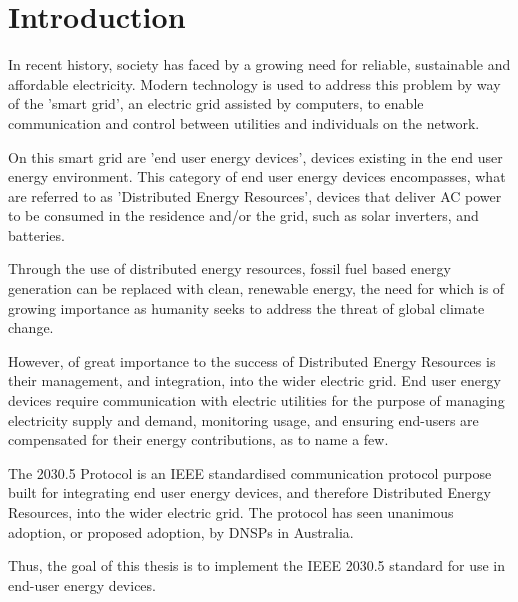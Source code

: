 \chapter{Introduction}\label{ch:intro}
In recent history, society has faced by a growing need for reliable, sustainable and affordable electricity.
Modern technology is used to address this problem by way of the 'smart grid', an electric grid assisted by computers, to enable communication and control between utilities and individuals on the network.

On this smart grid are 'end user energy devices', devices existing in the end user energy environment.
This category of end user energy devices encompasses, what are referred to as 'Distributed Energy Resources',
devices that deliver AC power to be consumed in the residence and/or the grid, such as solar inverters, and batteries. \cite{IEEE2030.5}

Through the use of distributed energy resources, fossil fuel based energy generation can be replaced with clean, 
renewable energy, the need for which is of growing importance as humanity seeks to address the threat of global climate change.

However, of great importance to the success of Distributed Energy Resources is their management, and integration, into the wider electric grid.
End user energy devices require communication with electric utilities for the purpose of managing electricity supply and demand, monitoring usage, 
and ensuring end-users are compensated for their energy contributions, as to name a few.

The 2030.5 Protocol is an IEEE standardised communication protocol purpose built for integrating end user energy devices, and therefore Distributed Energy Resources, into the wider electric grid.
The protocol has seen unanimous adoption, or proposed adoption, by DNSPs in Australia.\cite{DOEAdoption}

Thus, the goal of this thesis is to implement the IEEE 2030.5 standard for use in end-user energy devices.


